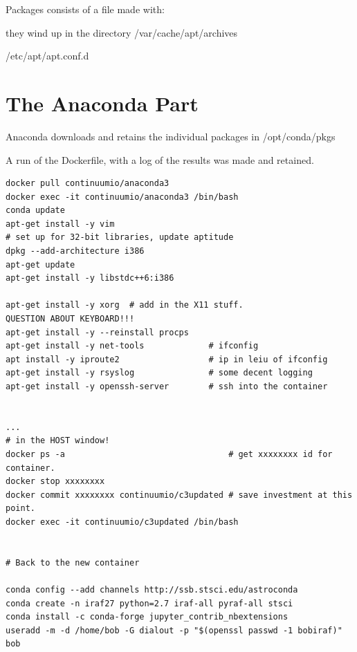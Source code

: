 \documentclass[letter,11pt,oneside]{article}
\newcommand{\dhl}[1]{{\color{verbcolor}{\texttt#1}}}
\begin{document}
\begin{tcolorbox}[breakable]
  
\end{tcolorbox}

Packages consists of a \dhl{Package.gz} file made with:

\dhl{apt-get download <packages...>} they wind up in the directory
/var/cache/apt/archives

\dhl{dpkg-scanpackages . /dev/null | gzip -9c > Packages.gz}

/etc/apt/apt.conf.d

\section{The Anaconda Part}

Anaconda downloads and retains the individual packages in
/opt/conda/pkgs

A run of the Dockerfile, with a log of the results was made and
retained.



\begin{tcolorbox}
  \begingroup \fontsize{10pt}{10pt}
\selectfont
\begin{verbatim} 
docker pull continuumio/anaconda3
docker exec -it continuumio/anaconda3 /bin/bash
conda update
apt-get install -y vim
# set up for 32-bit libraries, update aptitude
dpkg --add-architecture i386
apt-get update
apt-get install -y libstdc++6:i386

apt-get install -y xorg  # add in the X11 stuff.
QUESTION ABOUT KEYBOARD!!!
apt-get install -y --reinstall procps
apt-get install -y net-tools             # ifconfig
apt install -y iproute2                  # ip in leiu of ifconfig
apt-get install -y rsyslog               # some decent logging
apt-get install -y openssh-server        # ssh into the container


...
# in the HOST window!
docker ps -a                                 # get xxxxxxxx id for container.
docker stop xxxxxxxx
docker commit xxxxxxxx continuumio/c3updated # save investment at this point.
docker exec -it continuumio/c3updated /bin/bash


# Back to the new container

conda config --add channels http://ssb.stsci.edu/astroconda
conda create -n iraf27 python=2.7 iraf-all pyraf-all stsci
conda install -c conda-forge jupyter_contrib_nbextensions
useradd -m -d /home/bob -G dialout -p "$(openssl passwd -1 bobiraf)" bob
\end{verbatim}
\endgroup
\end{tcolorbox}
\end{document}
